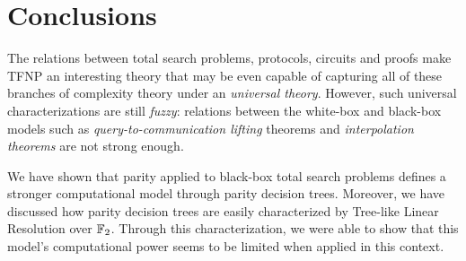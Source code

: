 \chapter*{Conclusions}


The relations between total search problems, protocols, circuits and proofs make \textsf{TFNP} an interesting theory that may be even capable of capturing all of these branches of complexity theory under an \textit{universal theory}. However, such universal characterizations are still \textit{fuzzy}: relations between the white-box and black-box models such as \textit{query-to-communication lifting} theorems and \textit{interpolation theorems} are not strong enough.

We have shown that parity applied to black-box total search problems defines a stronger computational model through parity decision trees. Moreover, we have discussed how parity decision trees are easily characterized by Tree-like Linear Resolution over $\mathbb{F}_2$. Through this characterization, we were able to show that this model's computational power seems to be limited when applied in this context.

